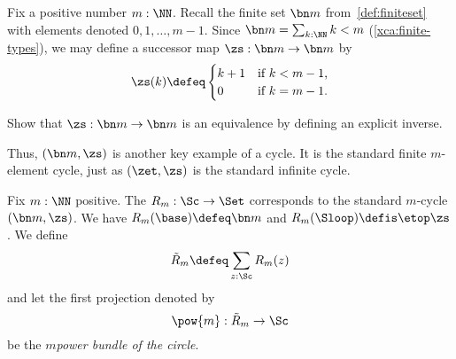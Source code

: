 Fix a positive number $m:\NN$. Recall the finite set $\bn m$ from~\cref{def:finiteset} with elements denoted $0,1,\dots,m-1$.
Since $\bn m = \sum_{k:\NN}k<m$ (\cref{xca:finite-types}),
we may define a successor map $\zs : \bn m \to \bn m$ by
\[
  \zs(k) \defeq
  \begin{cases}
    k+1 & \text{if $k<m-1$,} \\
    0   & \text{if $k=m-1$.}
  \end{cases}
\]
\begin{exercise}
  Show that $\zs : \bn m \to \bn m$ is an equivalence by defining
  an explicit inverse.
\end{exercise}
Thus, $(\bn m,\zs)$ is another key example of a cycle.
It is the standard finite $m$-element cycle,
just as $(\zet,\zs)$ is the standard infinite cycle.
\begin{definition}\label{def:RmtoS1}
  Fix $m:\NN$ positive.
  The \covering $R_m : \Sc\to\Set$ corresponds to the standard $m$-cycle
  $(\bn m,\zs)$. We have $R_m(\base) \defeq \bn m$ and
  $R_m(\Sloop) \defis \etop\zs$. We define
  \[
    \tilde R_m \defeq \sum_{z:\Sc} R_m(z)
  \]
  and let the first projection denoted by
  \[
    \pow{m} : \tilde R_m \to \Sc
  \]
  be the \emph{$m$\th power bundle of the circle}.
\end{definition}
